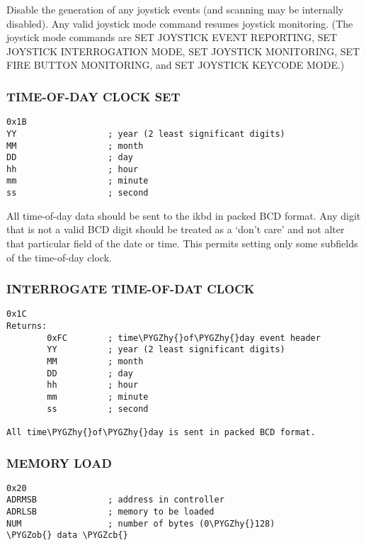 \documentclass[a4paper,8pt,english]{sphinxmanual}
\def\PYGZob{\char`\{}
\def\PYGZcb{\char`\}}
\def\PYGZhy{\char`\-}
\begin{document}
Disable the generation of any joystick events (and scanning may be internally
disabled). Any valid joystick mode command resumes joystick monitoring. (The
joystick mode commands are SET JOYSTICK EVENT REPORTING, SET JOYSTICK
INTERROGATION MODE, SET JOYSTICK MONITORING, SET FIRE BUTTON MONITORING, and
SET JOYSTICK KEYCODE MODE.)


\subsubsection{TIME-OF-DAY CLOCK SET}
\label{input/devices/atarikbd:time-of-day-clock-set}
\begin{Verbatim}[commandchars=\\\{\}]
0x1B
YY                  ; year (2 least significant digits)
MM                  ; month
DD                  ; day
hh                  ; hour
mm                  ; minute
ss                  ; second
\end{Verbatim}

All time-of-day data should be sent to the ikbd in packed BCD format.
Any digit that is not a valid BCD digit should be treated as a `don't care'
and not alter that particular field of the date or time. This permits setting
only some subfields of the time-of-day clock.


\subsubsection{INTERROGATE TIME-OF-DAT CLOCK}
\label{input/devices/atarikbd:interrogate-time-of-dat-clock}
\begin{Verbatim}[commandchars=\\\{\}]
0x1C
Returns:
        0xFC        ; time\PYGZhy{}of\PYGZhy{}day event header
        YY          ; year (2 least significant digits)
        MM          ; month
        DD          ; day
        hh          ; hour
        mm          ; minute
        ss          ; second

All time\PYGZhy{}of\PYGZhy{}day is sent in packed BCD format.
\end{Verbatim}


\subsubsection{MEMORY LOAD}
\label{input/devices/atarikbd:memory-load}
\begin{Verbatim}[commandchars=\\\{\}]
0x20
ADRMSB              ; address in controller
ADRLSB              ; memory to be loaded
NUM                 ; number of bytes (0\PYGZhy{}128)
\PYGZob{} data \PYGZcb{}
\end{Verbatim}
\end{document}
